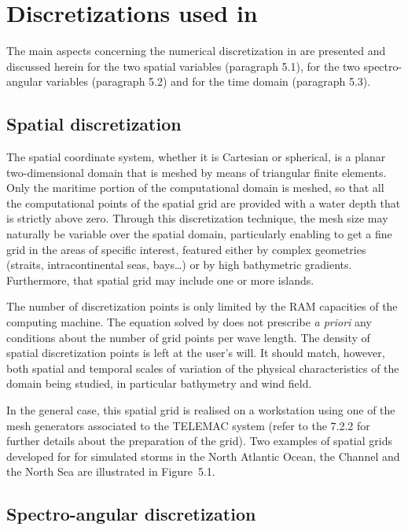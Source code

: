 

\chapter{ Discretizations used in \tomawac}

 The main aspects concerning the numerical discretization in \tomawac are presented and discussed herein for the two spatial variables (paragraph 5.1), for the two spectro-angular variables (paragraph 5.2) and for the time domain (paragraph 5.3).


\section{ Spatial discretization}

 The spatial coordinate system, whether it is Cartesian or spherical, is a planar two-dimensional domain that is meshed by means of triangular finite elements. Only the maritime portion of the computational domain is meshed, so that all the computational points of the spatial grid are provided with a water depth that is strictly above zero. Through this discretization technique, the mesh size may naturally be variable over the spatial domain, particularly enabling to get a fine grid in the areas of specific interest, featured either by complex geometries (straits, intracontinental seas, bays\dots ) or by high bathymetric gradients. Furthermore, that spatial grid may include one or more islands.

 The number of discretization points is only limited by the RAM capacities of the computing machine. The equation solved by \tomawac does not prescribe \textit{a priori }any conditions about the number of grid points per wave length. The density of spatial discretization points is left at the user's will. It should match, however, both spatial and temporal scales of variation of the physical characteristics of the domain being studied, in particular bathymetry and wind field.

 In the general case, this spatial grid is realised on a workstation using one of the mesh generators associated to the TELEMAC system (refer to the 7.2.2 for further details about the preparation of the grid). Two examples of spatial grids developed for \tomawac for simulated storms in the North Atlantic Ocean, the Channel and the North Sea are illustrated in Figure~5.1.


\section{ Spectro-angular discretization}


